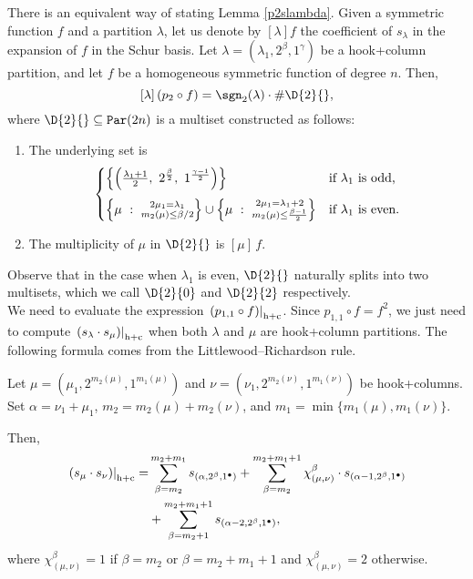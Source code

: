 \documentclass[twoside]{article}
\renewcommand{\hc}[1]{\left.\left(#1\right)\right|_{\textnormal{h+c}}}
\begin{document}
There is an equivalent way of stating Lemma
\ref{p2slambda}. Given a symmetric function $f$ and a partition $\lambda$, let us denote by $[\lambda]f$ the coefficient of $s_\lambda$ in the expansion of $f$ in the Schur basis.
Let $\lambda = (\lambda_1, 2^\beta, 1^\gamma)$ be a hook+column partition, and let $f$ be a homogeneous symmetric function of degree $n$. Then,   
\[
[\lambda]\, (p_2\circ f) = \sgn_2(\lambda)\cdot\#\D{2}{},
\]
where $\D{2}{}\subseteq\mathtt{Par}(2n)$ is a multiset constructed as follows: 
\begin{enumerate}
    \item 
The underlying set is
    \[
    \begin{cases}
        \left\{\left(\frac{\lambda_1+1}{2},\ 2^{\frac{\beta}{2}},\ 1^{\frac{\gamma-1}{2}}\right)\right\}
        & \text{if } \lambda_1 \text{ is odd,}
        \\
        \phantom{.}
        \vspace{-0.75em} %
        \\
        \left\{\mu\ : \ \substack{2\mu_1=\lambda_1\\ m_2(\mu)\le\beta /2}\right\}\cup\left\{\mu\ : \ \substack{2\mu_1=\lambda_1+2\\ m_2(\mu)\le \frac{\beta-1}{2}}\right\}
        & \text{if } \lambda_1 \text{ is even.}
    \end{cases}
    \]
    
\item
    The multiplicity of  $\mu$ in $\D{2}{}$ is $[\mu] \, f$.
\end{enumerate}
\noindent
Observe that in the case when $\lambda_1$ is even, $\D{2}{}$ naturally splits into two multisets, which we call $\D{2}{0}$ and $\D{2}{2}$ respectively.\\




We need to  evaluate  the expression $\hc{p_
{1,1}\circ f}$. Since $p_{1,1}\circ f = f^2$, we just need  to compute $\hc{s_\lambda\cdot s_\mu}$ when both $\lambda$ and $\mu$ are hook+column partitions. The following formula comes from the Littlewood--Richardson rule.

\begin{lem}\label{p11slambda}
Let $\mu = (\mu_1, 2^{m_2(\mu)}, 1^{m_1(\mu)})$ and $\nu = (\nu_1, 2^{m_2(\nu)}, 1^{m_1(\nu)})$ be hook+columns.  Set $\alpha = \nu_1 + \mu_1$,  $m_2 =m_2(\mu) + m_2(\nu)$, and $m_1 = \min\{m_1(\mu), m_1(\nu)\}$. 

Then,
\begin{align*} %
\hc{s_\mu\cdot s_\nu} = &\sum\limits_{\beta = m_2}^{m_2 + m_1} s_{(\alpha, 2^\beta, 1^\bullet)}  
+ \sum\limits_{\beta=m_2}^{m_2 + m_1 + 1} \chi_{(\mu,\nu)}^\beta\cdot s_{(\alpha-1, 2^{\beta}, 1^\bullet)} \\
&+ \sum\limits_{\beta=m_2 +1}^{m_2 + m_1+1} s_{(\alpha-2, 2^\beta, 1^\bullet)},
\end{align*}
where $\chi_{(\mu,\nu)}^\beta=1$ if $\beta=m_2$ or $\beta=m_2+m_1+1$ and $\chi_{(\mu,\nu)}^\beta=2$ otherwise.
        \end{lem}
\end{document}
